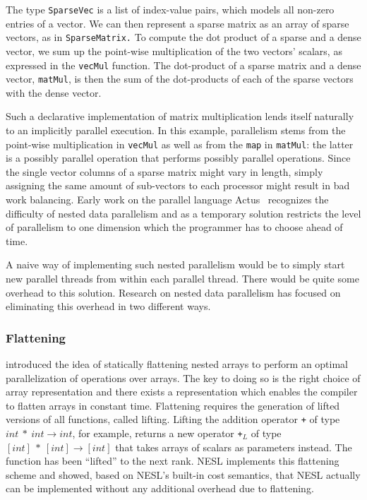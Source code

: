 \documentclass[a4paper]{article}
\begin{document}
The type \texttt{SparseVec} is a list of index-value pairs, which models all non-zero entries of a vector. We can then represent a sparse matrix as an array of sparse vectors, as in \texttt{SparseMatrix.} To compute the dot product of a sparse and a dense vector, we sum up the point-wise multiplication of the two vectors' scalars, as expressed in the \texttt{vecMul} function. The dot-product of a sparse matrix and a dense vector, \texttt{matMul}, is then the sum of the dot-products of each of the sparse vectors with the dense vector.

Such a declarative implementation of matrix multiplication lends itself naturally to an implicitly parallel execution. In this example, parallelism stems from the point-wise multiplication in \texttt{vecMul} as well as from the \texttt{map} in \texttt{matMul}: the latter is a possibly parallel operation that performs possibly parallel operations. Since the single vector columns of a sparse matrix might vary in length, simply assigning the same amount of sub-vectors to each processor might result in bad work balancing. Early work on the parallel language Actus~\cite{Perrott:1979:LAV:357073.357075} recognizes the difficulty of nested data parallelism and as a temporary solution restricts the level of parallelism to one dimension which the programmer has to choose ahead of time.

A naive way of implementing such nested parallelism would be to simply start new parallel threads from within each parallel thread. There would be quite some overhead to this solution. Research on nested data parallelism has focused on eliminating this overhead in two different ways.

\subsubsection{Flattening}

\citet{Blelloch1993Implementation} introduced the idea of statically flattening nested arrays to perform an optimal parallelization of operations over arrays. The key to doing so is the right choice of array representation and there exists a representation which enables the compiler to flatten arrays in constant time. Flattening requires the generation of lifted versions of all functions, called lifting. Lifting the addition operator \texttt{+} of type $int ~ * ~ int \rightarrow int$, for example, returns a new operator \texttt{+}$_L$ of type $[int] ~ * ~ [int] \rightarrow [int]$ that takes arrays of scalars as parameters instead. The function has been ``lifted'' to the next rank. NESL implements this flattening scheme and \citet{Blelloch:1996:PTS:232627.232650} showed, based on NESL's built-in cost semantics, that NESL actually can be implemented without any additional overhead due to flattening.
\end{document}
